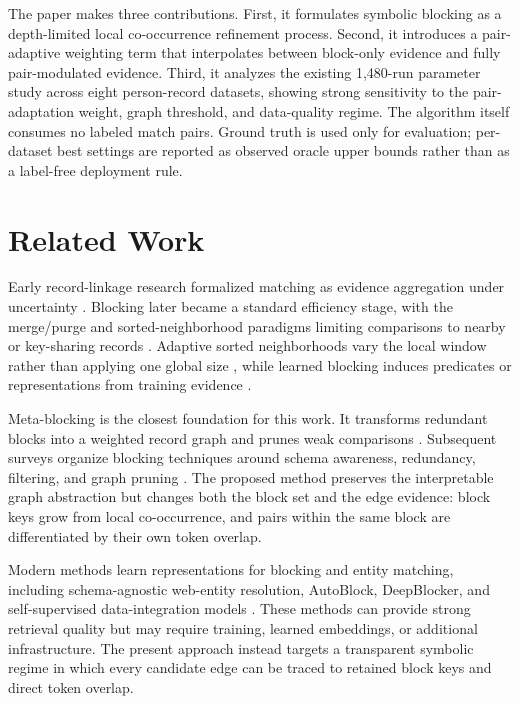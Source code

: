 \documentclass[conference]{IEEEtran}
\begin{document}
The paper makes three contributions. First, it formulates symbolic blocking as a depth-limited local co-occurrence refinement process. Second, it introduces a pair-adaptive weighting term that interpolates between block-only evidence and fully pair-modulated evidence. Third, it analyzes the existing 1,480-run parameter study across eight person-record datasets, showing strong sensitivity to the pair-adaptation weight, graph threshold, and data-quality regime. The algorithm itself consumes no labeled match pairs. Ground truth is used only for evaluation; per-dataset best settings are reported as observed oracle upper bounds rather than as a label-free deployment rule.

\section{Related Work}
Early record-linkage research formalized matching as evidence aggregation under uncertainty \cite{newcombe1959,fellegi1969}. Blocking later became a standard efficiency stage, with the merge/purge and sorted-neighborhood paradigms limiting comparisons to nearby or key-sharing records \cite{hernandez1995}. Adaptive sorted neighborhoods vary the local window rather than applying one global size \cite{yan2007,draisbach2011}, while learned blocking induces predicates or representations from training evidence \cite{bilenko2006}.

Meta-blocking is the closest foundation for this work. It transforms redundant blocks into a weighted record graph and prunes weak comparisons \cite{papadakis2014}. Subsequent surveys organize blocking techniques around schema awareness, redundancy, filtering, and graph pruning \cite{papadakis2020}. The proposed method preserves the interpretable graph abstraction but changes both the block set and the edge evidence: block keys grow from local co-occurrence, and pairs within the same block are differentiated by their own token overlap.

Modern methods learn representations for blocking and entity matching, including schema-agnostic web-entity resolution, AutoBlock, DeepBlocker, and self-supervised data-integration models \cite{efthymiou2019,zhang2020,thirumuruganathan2021,wang2023}. These methods can provide strong retrieval quality but may require training, learned embeddings, or additional infrastructure. The present approach instead targets a transparent symbolic regime in which every candidate edge can be traced to retained block keys and direct token overlap.
\end{document}
